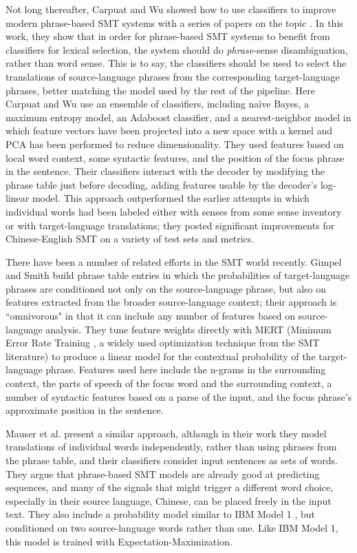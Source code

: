 Not long thereafter, Carpuat and Wu showed how to use classifiers to
improve modern phrase-based SMT systems with a series of papers on the topic
\cite{carpuatpsd,carpuat-wu:2007:EMNLP-CoNLL2007,carpuat2008evaluation,improvingsmtwsd}.
In this work, they show that in order for phrase-based SMT systems to benefit
from classifiers for lexical selection, the system should do
\emph{phrase}-sense disambiguation, rather than word sense. This is to say, the
classifiers should be used to select the translations of source-language
phrases from the corresponding target-language phrases, better matching the
model used by the rest of the pipeline.
Here Carpuat and Wu use an ensemble of classifiers, including naïve Bayes, a
maximum entropy model, an Adaboost classifier, and a nearest-neighbor model in
which feature vectors have been projected into a new space with a kernel and
PCA has been performed to reduce dimensionality.
They used features based on local word context, some syntactic features, and
the position of the focus phrase in the sentence. Their classifiers interact
with the decoder by modifying the phrase table just before decoding, adding
features usable by the decoder's log-linear model.
This approach outperformed the earlier attempts in which individual words had
been labeled either with senses from some sense inventory or with
target-language translations; they posted significant improvements for
Chinese-English SMT on a variety of test sets and metrics.

There have been a number of related efforts in the SMT world recently.
Gimpel and Smith \cite{gimpel-smith:2008:WMT} build phrase table entries in
which the probabilities of target-language phrases are conditioned not only on
the source-language phrase, but also on features extracted from the broader
source-language context; their approach is ``omnivorous" in that it can include
any number of features based on source-language analysis. They tune feature
weights directly with MERT (Minimum Error Rate Training \cite{och:2003:ACL}, a
widely used optimization technique from the SMT literature)
to produce a linear model for the contextual
probability of the target-language phrase. Features used here include the
n-grams in the surrounding context, the parts of speech of the focus word and
the surrounding context, a number of syntactic features based on a parse of
the input, and the focus phrase's approximate position in the sentence.

Mauser et al. \cite{mauser-hasan-ney:2009:EMNLP} present a similar approach,
although in their work they model translations of individual words
independently, rather than using phrases from the phrase table, and their
classifiers consider input sentences as sets of words. They argue that
phrase-based SMT models are already good at predicting sequences, and many of
the signals that might trigger a different word choice, especially in their
source language, Chinese, can be placed freely in the input text. They also
include a probability model similar to IBM Model 1
\cite{DBLP:journals/coling/BrownPPM94}, but conditioned on two source-language
words rather than one. Like IBM Model 1, this model is trained with
Expectation-Maximization.

